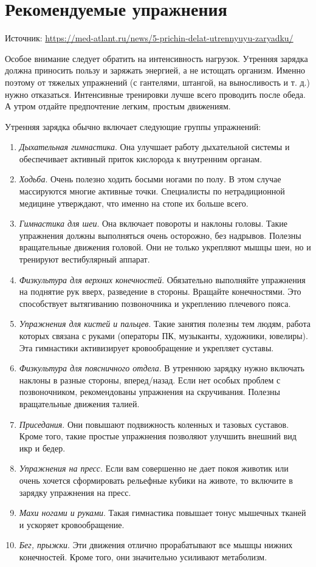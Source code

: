 \newpage
\section{Рекомендуемые упражнения}
Источник: \url{https://med-atlant.ru/news/5-prichin-delat-utrennyuyu-zaryadku/}

Особое внимание следует обратить на интенсивность нагрузок. Утренняя зарядка должна приносить пользу и заряжать энергией, а не истощать организм. Именно поэтому от тяжелых упражнений (с гантелями, штангой, на выносливость и т. д.) нужно отказаться. Интенсивные тренировки лучше всего проводить после обеда. А утром отдайте предпочтение легким, простым движениям.

Утренняя зарядка обычно включает следующие группы упражнений:
\begin{enumerate}
    \item \textit{Дыхательная гимнастика}. Она улучшает работу дыхательной системы и обеспечивает активный приток кислорода к внутренним органам.
    \item \textit{Ходьба}. Очень полезно ходить босыми ногами по полу. В этом случае массируются многие активные точки. Специалисты по нетрадиционной медицине утверждают, что именно на стопе их больше всего.
    \item \textit{Гимнастика для шеи}. Она включает повороты и наклоны головы. Такие упражнения должны выполняться очень осторожно, без надрывов. Полезны вращательные движения головой. Они не только укрепляют мышцы шеи, но и тренируют вестибулярный аппарат.
    \item \textit{Физкультура для верхних конечностей}. Обязательно выполняйте упражнения на поднятие рук вверх, разведение в стороны. Вращайте конечностями. Это способствует вытягиванию позвоночника и укреплению плечевого пояса.
    \item \textit{Упражнения для кистей и пальцев}. Такие занятия полезны тем людям, работа которых связана с руками (операторы ПК, музыканты, художники, ювелиры). Эта гимнастики активизирует кровообращение и укрепляет суставы.
    \item \textit{Физкультура для поясничного отдела}. В утреннюю зарядку нужно включать наклоны в разные стороны, вперед/назад. Если нет особых проблем с позвоночником, рекомендованы упражнения на скручивания. Полезны вращательные движения талией.
    \item \textit{Приседания}. Они повышают подвижность коленных и тазовых суставов. Кроме того, такие простые упражнения позволяют улучшить внешний вид икр и бедер.
    \item \textit{Упражнения на пресс}. Если вам совершенно не дает покоя животик или очень хочется сформировать рельефные кубики на животе, то включите в зарядку упражнения на пресс.
    \item \textit{Махи ногами и руками}. Такая гимнастика повышает тонус мышечных тканей и ускоряет кровообращение.
    \item \textit{Бег, прыжки}. Эти движения отлично прорабатывают все мышцы нижних конечностей. Кроме того, они значительно усиливают метаболизм.
\end{enumerate}
